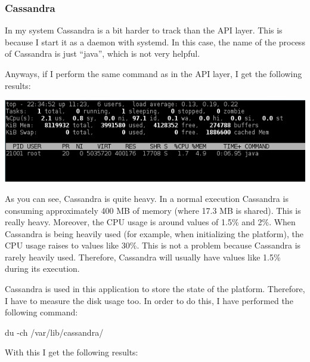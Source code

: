 \subsubsection*{Cassandra}

In my system Cassandra is a bit harder to track than the API layer. This is
because I start it as a daemon with systemd. In this case, the name of the
process of Cassandra is just ``java'', which is not very helpful.

Anyways, if I perform the same command as in the API layer, I get the following
results:

\begin{center}
  \includegraphics[scale=0.8]{hardware/images/cassandra.png}
\end{center}

As you can see, Cassandra is quite heavy. In a normal execution Cassandra is
consuming approximately 400 MB of memory (where 17.3 MB is shared). This is
really heavy. Moreover, the CPU usage is around values of 1.5\% and 2\%. When
Cassandra is  being heavily used (for example, when initializing the platform),
the CPU usage raises to values like 30\%. This is not a problem because
Cassandra is rarely heavily used. Therefore, Cassandra will usually have values
like 1.5\% during its execution.

Cassandra is used in this application to store the state of the platform.
Therefore, I have to measure the disk usage too. In order to do this, I have
performed the following command:

\begin{center}
  du -ch /var/lib/cassandra/
\end{center}

With this I get the following results:

